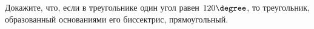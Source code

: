 \begin{listofex}
	\item Докажите, что, если в треугольнике один угол равен \( 120\degree \), то треугольник, образованный основаниями его биссектрис, прямоугольный.
	
	
	
	
	
	
	
	
	
	
	
\end{listofex}

